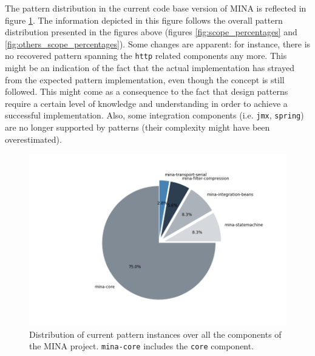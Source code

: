 The pattern distribution in the current code base version of MINA is reflected in figure \ref{fig:current_scopes_percentages}. The information depicted in this figure follows the overall pattern distribution presented in the figures above (figures \ref{fig:scope_percentages} and \ref{fig:others_scope_percentages}). Some changes are apparent: for instance, there is no recovered pattern spanning the \texttt{http} related components any more. This might be an indication of the fact that the actual implementation has strayed from the expected pattern implementation, even though the concept is still followed. This might come as a consequence to the fact that design patterns require a certain level of knowledge and understanding in order to achieve a successful implementation. Also, some integration components (i.e. \texttt{jmx}, \texttt{spring}) are no longer supported by patterns (their complexity might have been overestimated).
\begin{figure}[H]
    \centering
    \includegraphics[width =\textwidth]{images/graphs/current_scopes_per.png}
    \caption{Distribution of current pattern instances over all the components of the MINA project. \texttt{mina-core} includes the \texttt{core} component.}
    \label{fig:current_scopes_percentages}
\end{figure}

